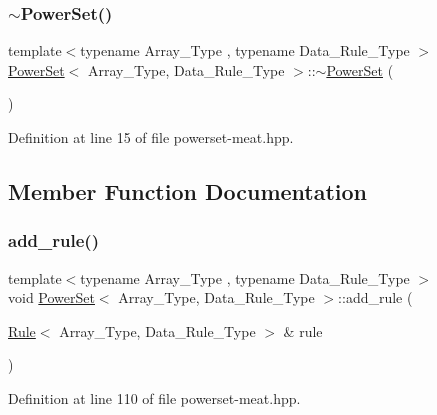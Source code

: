\subsubsection{\texorpdfstring{$\sim$\+Power\+Set()}{~PowerSet()}}
{\footnotesize\ttfamily template$<$typename Array\+\_\+\+Type , typename Data\+\_\+\+Rule\+\_\+\+Type $>$ \\
\hyperlink{class_power_set}{Power\+Set}$<$ Array\+\_\+\+Type, Data\+\_\+\+Rule\+\_\+\+Type $>$\+::$\sim$\hyperlink{class_power_set}{Power\+Set} (\begin{DoxyParamCaption}{ }\end{DoxyParamCaption})\hspace{0.3cm}{\ttfamily [inline]}}



Definition at line 15 of file powerset-\/meat.\+hpp.



\subsection{Member Function Documentation}
\mbox{\label{class_power_set_a00ee318a40da91bcf0bff79bf71454ab}} 
\subsubsection{\texorpdfstring{add\+\_\+rule()}{add\_rule()}\hspace{0.1cm}{\footnotesize\ttfamily [1/3]}}
{\footnotesize\ttfamily template$<$typename Array\+\_\+\+Type , typename Data\+\_\+\+Rule\+\_\+\+Type $>$ \\
void \hyperlink{class_power_set}{Power\+Set}$<$ Array\+\_\+\+Type, Data\+\_\+\+Rule\+\_\+\+Type $>$\+::add\+\_\+rule (\begin{DoxyParamCaption}\item[{\hyperlink{class_rule}{Rule}$<$ Array\+\_\+\+Type, Data\+\_\+\+Rule\+\_\+\+Type $>$ \&}]{rule }\end{DoxyParamCaption})\hspace{0.3cm}{\ttfamily [inline]}}



Definition at line 110 of file powerset-\/meat.\+hpp.

\mbox{\label{class_power_set_a6cb8fb8f09b4c190e2ac6c07daa1241e}} 
